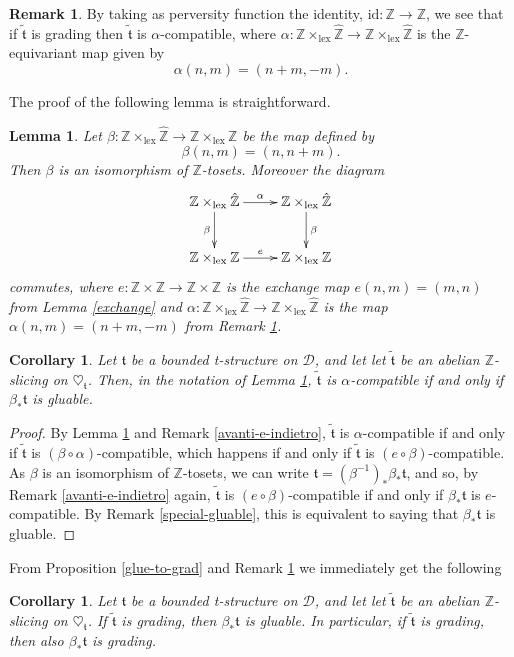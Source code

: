 \documentclass{article}
\newtheorem{cor}[thm]{Corollary}
\newtheorem{lem}[thm]{Lemma}
\theoremstyle{definition}
\newtheorem{rem}[thm]{Remark}
\newcommand{\Z}{\mathbb{Z}}
\newcommand{\tee}{\mathfrak{t}}
\begin{document}
\begin{rem}\label{alpha}
By taking as perversity function the identity, $\mathrm{id}\colon \Z\to \Z$, we see that if $\tilde{\tee}$ is grading then $\tilde{\tee}$ is $\alpha$-compatible, where $\alpha\colon \mathbb{Z} \times_{\mathrm{lex}} \hat{\mathbb{Z}}\to \mathbb{Z} \times_{\mathrm{lex}} \hat{\mathbb{Z}}$ is the $\Z$-equivariant map given by
\[
\alpha(n,m)=(n+m,-m).
\]
\end{rem}

The proof of the following lemma is straightforward.
\begin{lem}\label{from-alpha-to-e}
Let $\beta\colon \mathbb{Z} \times_{\mathrm{lex}} \hat{\mathbb{Z}}\to \mathbb{Z} \times_{\mathrm{lex}} {\mathbb{Z}}$ be the map defined by
\[
\beta(n,m)=(n,n+m).
\]
Then $\beta$ is an isomorphism of $\Z$-tosets. Moreover the diagram
\[
\xymatrix{
\mathbb{Z} \times_{\mathrm{lex}} \hat{\mathbb{Z}}\ar[r]^{\alpha}\ar[d]_{\beta}& \mathbb{Z} \times_{\mathrm{lex}} \hat{\mathbb{Z}}\ar[d]^{\beta}\\
\mathbb{Z} \times_{\mathrm{lex}} {\mathbb{Z}}\ar[r]^{e}& \mathbb{Z} \times_{\mathrm{lex}} {\mathbb{Z}}
}
\]
commutes,
where $e\colon \Z\times \Z \to \Z\times \Z$ is the exchange map $e(n,m)=(m,n)$ from Lemma \ref{exchange} and $\alpha\colon \mathbb{Z} \times_{\mathrm{lex}} \hat{\mathbb{Z}}\to \mathbb{Z} \times_{\mathrm{lex}} \hat{\mathbb{Z}}$ is the map $\alpha(n,m)=(n+m,-m)$ from Remark \ref{alpha}.
\end{lem}

\begin{cor}
Let $\mathfrak{t}$ be a bounded t-structure on $\mathscr{D}$, and let let $\tilde{\tee}$ be an abelian $\mathbb{Z}$-slicing on $\heartsuit_{\mathfrak{t}}$. Then, in the notation of Lemma \ref{from-alpha-to-e}, $\tilde{\tee}$ is $\alpha$-compatible if and only if $\beta_*\tee$ is gluable.
\end{cor}
\begin{proof}
By Lemma \ref{from-alpha-to-e} and Remark \ref{avanti-e-indietro}, $\tilde{\tee}$ is $\alpha$-compatible if and only if $\tilde{\tee}$ is $(\beta\circ\alpha)$-compatible, which happens if and only if $\tilde{\tee}$ is $(e\circ\beta)$-compatible. As $\beta$ is an isomorphism of $\Z$-tosets, we can write $\tee=(\beta^{-1})_*\beta_*\tee$, and so, by Remark \ref{avanti-e-indietro} again, $\tilde{\tee}$ is $(e\circ\beta)$-compatible if and only if $\beta_*\tee$ is $e$-compatible. By Remark \ref{special-gluable}, this is equivalent to saying that $\beta_*\tee$ is gluable. 
\end{proof}
From Proposition \ref{glue-to-grad} and Remark \ref{alpha} we immediately get the following
\begin{cor}
Let $\mathfrak{t}$ be a bounded t-structure on $\mathscr{D}$, and let let $\tilde{\tee}$ be an abelian $\mathbb{Z}$-slicing on $\heartsuit_{\mathfrak{t}}$. If $\tilde{\tee}$ is grading, then $\beta_*\tee$ is gluable. In particular, if $\tilde{\tee}$ is grading, then also $\beta_*\tee$ is grading.
\end{cor}
\end{document}
